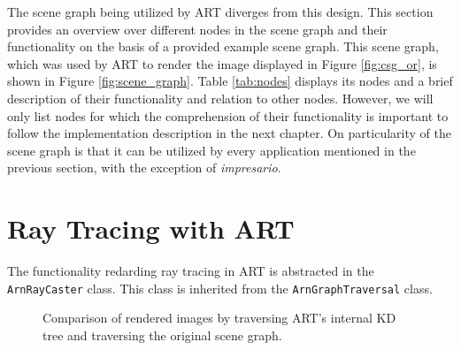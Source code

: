 The scene graph being utilized by ART diverges from this design. This section provides an overview over different nodes in the scene graph and their functionality on the basis of a provided example scene graph. This scene graph, which was used by ART to render the image displayed in Figure \ref{fig:csg_or}, is shown in Figure \ref{fig:scene_graph}. Table \ref{tab:nodes} displays its nodes and a brief description of their functionality and relation to other nodes. However, we will only list nodes for which the comprehension of their functionality is important to follow the implementation description in the next chapter.
On particularity of the scene graph is that it can be utilized by every application mentioned in the previous section, with the exception of \emph{impresario}.

\section{Ray Tracing with ART}
The functionality redarding ray tracing in ART is abstracted in the \texttt{ArnRayCaster} class. This class is inherited from the \texttt{ArnGraphTraversal} class. 



\begin{figure}[!tbp]
	\centering
	\hfill
	\caption{Comparison of rendered images by traversing ART's internal KD tree and traversing the original scene graph.}
	\label{fig:org_scenegraph}
\end{figure}

